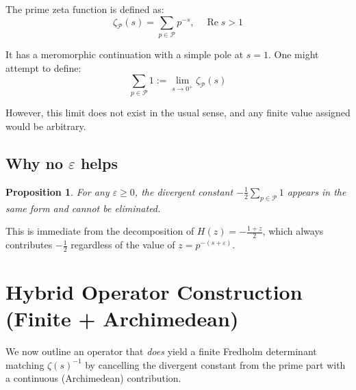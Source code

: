 \documentclass[11pt,a4paper]{article}
\newtheorem{proposition}[theorem]{Proposition}
\theoremstyle{definition}
\theoremstyle{remark}
\newcommand{\calP}{\mathcal{P}}
\DeclareMathOperator{\Re}{Re}
\begin{document}
The prime zeta function is defined as:
\[
\zeta_{\calP}(s) = \sum_{p \in \calP} p^{-s}, \quad \Re s > 1
\]

It has a meromorphic continuation with a simple pole at $s = 1$. One might attempt to define:
\[
\sum_{p \in \calP} 1 := \lim_{s \to 0^+} \zeta_{\calP}(s)
\]

However, this limit does not exist in the usual sense, and any finite value assigned 
would be arbitrary.

\subsection{Why no $\varepsilon$ helps}

\begin{proposition}
For any $\varepsilon \geq 0$, the divergent constant $-\frac{1}{2}\sum_{p \in \calP} 1$ 
appears in the same form and cannot be eliminated.
\end{proposition}

This is immediate from the decomposition of $H(z) = -\frac{1+z}{2}$, which always 
contributes $-\frac{1}{2}$ regardless of the value of $z = p^{-(s+\varepsilon)}$.

\section{Hybrid Operator Construction (Finite + Archimedean)}\label{sec:hybrid}

We now outline an operator that \emph{does} yield a finite Fredholm determinant
matching $\zeta(s)^{-1}$ by cancelling the divergent constant from the prime part
with a continuous (Archimedean) contribution.
\end{document}
